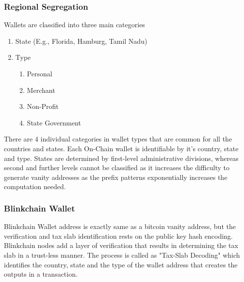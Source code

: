 \documentclass[letterpaper,11pt]{article}
\begin{document}
\subsubsection{Regional Segregation}

Wallets are classified into three main categories
\begin{enumerate}
\item State (E.g., Florida, Hamburg, Tamil Nadu)
\item Type
	\begin{enumerate}
	\item Personal
	\item Merchant
	\item Non-Profit
	\item State Government
	\end{enumerate}
\end{enumerate}

There are 4 individual categories in wallet types that are common for all the countries and states. Each On-Chain wallet is identifiable by it's country, state and type. States are determined by first-level administrative divisions, whereas second and further levels cannot be classified as it increases the difficulty to generate vanity addresses as the prefix patterns exponentially increases the computation needed. 


\subsubsection{Blinkchain Wallet}

Blinkchain Wallet address is exactly same as a bitcoin vanity address, but the verification and tax slab identification rests on the public key hash encoding. Blinkchain nodes add a layer of verification that results in determining the tax slab in a trust-less manner. The process is called as "Tax-Slab Decoding" which identifies the country, state and the type of the wallet address that creates the outputs in a transaction.\\
\end{document}

